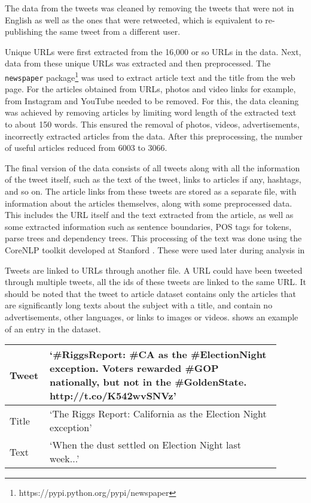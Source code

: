 The data from the tweets was cleaned by removing the tweets that were not in English as well as the ones that were retweeted, which is equivalent to re-publishing the same tweet from a different user. 

Unique URLs were first extracted from the 16,000 or so URLs in the data. Next, data from these unique URLs was extracted and then preprocessed. The \texttt{newspaper} package\footnote{https://pypi.python.org/pypi/newspaper} was used to extract article text and the title from the web page. For the articles obtained from URLs, photos and video links for example, from Instagram and YouTube needed to be removed. For this, the data cleaning was achieved by removing articles by limiting word length of the extracted text to about 150 words. This ensured the removal of photos, videos, advertisements, incorrectly extracted articles from the data.  After this preprocessing, the number of useful articles reduced from 6003 to 3066.

The final version of the data consists of all tweets along with all the information of the tweet itself, such as the text of the tweet, links to articles if any, hashtags, and so on. The article links from these tweets are stored as a separate file, with information about the articles themselves, along with some preprocessed data. This includes the URL itself and the text extracted from the article, as well as some extracted information such as sentence boundaries, POS tags for tokens, parse trees and dependency trees. This processing of the text was done using the CoreNLP toolkit developed at Stanford . These were used later during analysis in 

Tweets are linked to URLs through another file.  A URL could have been tweeted through multiple tweets, all the ids of these tweets are linked to the same URL. It should be noted that the tweet to article dataset contains only the articles that are significantly long texts about the subject with a title, and contain no advertisements, other languages, or links to images or videos.  shows an example of an entry in the dataset.

\begin{table}[htbp]
\centering
\begin{tabular}{|p{0.1\linewidth}|p{0.8\linewidth}|}
\hline
Tweet & `\#RiggsReport: \#CA as the \#ElectionNight exception. Voters rewarded \#GOP nationally, but not in the \#GoldenState. http://t.co/K542wvSNVz' \\ \hline
Title & `The Riggs Report: California as the Election Night exception'                                                                                 \\ \hline
Text  & `When the dust settled on Election Night last week...'                                                                                         \\ \hline
\end{tabular}
\label{tab:ex1}
\end{table}